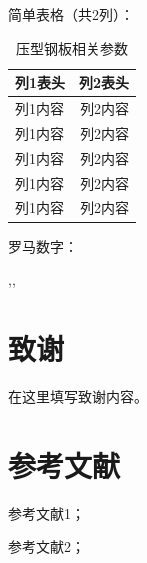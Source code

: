 \documentclass[12pt]{ctexrep}
\begin{document}
    简单表格（共2列）：

    \begin{table}[H]
      \centering
      \caption{压型钢板相关参数}
      \begin{tabular}{lr}
          \toprule
          列1表头&列2表头\\
          \midrule
          列1内容&列2内容\\
          列1内容&列2内容\\
          列1内容&列2内容\\
          列1内容&列2内容\\
          列1内容&列2内容\\
          \bottomrule
      \end{tabular}
    \end{table}

    罗马数字：
    
    \uppercase\expandafter{},\uppercase\expandafter{},
    \uppercase\expandafter{}

\newpage %
\chapter*{致谢} %
    在这里填写致谢内容。

\newpage

\chapter*{参考文献}
    \begin{enumerate}[{[}1{]}]
      \item 参考文献1；
      \item 参考文献2；
    \end{enumerate}
\end{document}
